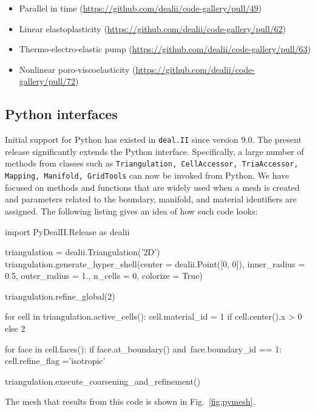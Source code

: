 \documentclass{ansarticle-preprint}
\newcommand{\specialword}[1]{\texttt{#1}}
\newcommand{\dealii}{{\specialword{deal.II}}\xspace}
\begin{document}
\begin{itemize}
  \item Parallel in time (\url{https://github.com/dealii/code-gallery/pull/49})
  \item Linear elastoplasticity (\url{https://github.com/dealii/code-gallery/pull/62})
  \item Thermo-electro-elastic pump (\url{https://github.com/dealii/code-gallery/pull/63})
  \item Nonlinear poro-viscoelasticity (\url{https://github.com/dealii/code-gallery/pull/72})
\end{itemize}

\subsection{Python interfaces}
\label{subsec:python}

Initial support for Python has existed in \dealii{} since version
9.0. The present release significantly extends the Python
interface. Specifically, a large number of methods from classes such
as \texttt{Triangulation, CellAccessor, TriaAccessor, Mapping,
  Manifold, GridTools} can now be invoked from Python. We have focused
on methods and functions that are widely used when a mesh is created
and parameters related to the boundary, manifold, and material
identifiers are assigned. The following listing gives an idea of how
such code looks:
\begin{python}
  import PyDealII.Release as dealii

  triangulation = dealii.Triangulation('2D')
  triangulation.generate_hyper_shell(center = dealii.Point([0, 0]),
  inner_radius = 0.5, outer_radius = 1.,
  n_cells = 0, colorize = True)

  triangulation.refine_global(2)

  for cell in triangulation.active_cells():
  cell.material_id = 1 if cell.center().x > 0 else 2

  for face in cell.faces():
  if face.at_boundary() and\
  face.boundary_id == 1:
  cell.refine_flag ='isotropic'

  triangulation.execute_coarsening_and_refinement()
\end{python}
The mesh that results from this code is shown in Fig.~\ref{fig:pymesh}.
\end{document}
